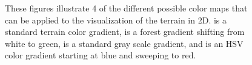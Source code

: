 \begin{figure}[ht]
{	\label{fig:oman_color_2}
}
  \caption{These figures illustrate 4 of the different possible color maps that can be applied to the visualization of the terrain in 2D.  is a standard terrain color gradient,  is a forest gradient shifting from white to green,  is a standard gray scale gradient, and  is an HSV color gradient starting at blue and sweeping to red.}
\label{fig:terrain_color_schemes}
\end{figure}

